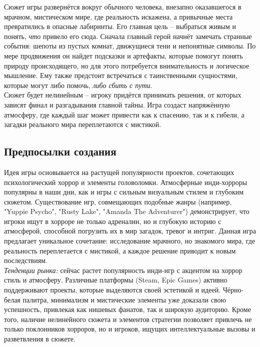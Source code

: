 \documentclass{article}
\begin{document}
	Сюжет игры развернётся вокруг обычного человека, внезапно оказавшегося в мрачном, мистическом мире, где реальность искажена, а привычные места превратились в опасные лабиринты. Его главная цель -- выбраться живым и понять, \textit{что} привело его сюда.   
	Сначала главный герой начнёт замечать странные события: шепоты из пустых комнат, движущиеся тени и непонятные символы. По мере продвижения он найдет подсказки и артефакты, которые помогут понять природу происходящего, но для этого потребуется внимательность и логическое мышление. Ему также предстоит встречаться с таинственными сущностями, которые могут либо помочь, \textit{либо сбить с пути}. \\
	
	Сюжет будет нелинейным -- игроку придётся принимать решения, от которых зависят финал и разгадывания главной тайны. Игра создаст напряжённую атмосферу, где каждый шаг может привести как к спасению, так и к гибели, а загадки реального мира переплетаются с мистикой. \\
	
	
	\newpage
	\subsection{Предпосылки создания}
	
	Идея игры основывается на растущей популярности проектов, сочетающих психологический хоррор и элементы головоломки. Атмосферные инди-хорроры популярны в наши дни, как и игры с сильным визуальным стилем и глубоким сюжетом. Существование игр, совмещающих подобные жанры (например, "Yuppie Psycho", "Rusty Lake", "Amanda The Adventurer") демонстрирует, что игроки ищут в хорроре не только адреналин, но и глубокую историю с атмосферой, способной погрузить их в мир загадок, тревог и интриг. Данная игра предлагает уникальное сочетание: исследование мрачного, но знакомого мира, где реальность переплетается с мистикой, а каждое решение приводит к новым последствиям. \\
	
	\textit{Тенденции рынка:} сейчас растет популярность инди-игр с акцентом на хоррор стиль и атмосферу. Различные платформы (Steam, Epic Games) активно поддерживают проекты, которые выделяются своей эстетикой и идеей. Чёрно-белая палитра, минимализм и мистические элементы уже доказали свою успешность, привлекая как нишевых фанатов, так и широкую аудиторию. Кроме того, наличие нелинейного сюжета и элементов стратегии позволяет привлечь не только поклонников хорроров, но и игроков, ищущих интеллектуальные вызовы и разветвления в сюжете.
	
\end{document}
